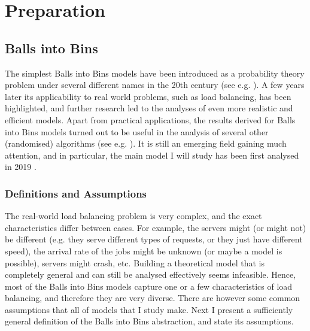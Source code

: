\chapter{Preparation}\label{preparation}

\ifpdf
    \graphicspath{{Chapter2/Figs/Raster/}{Chapter2/Figs/PDF/}{Chapter2/Figs/}}
\else
    \graphicspath{{Chapter2/Figs/Vector/}{Chapter2/Figs/}}
\fi



\section{Balls into Bins}


The simplest Balls into Bins models have been introduced as a probability theory problem under several different names in the 20th century (see e.g. \cite{kolchin1978coined}). A few years later its applicability to real world problems, such as load balancing, has been highlighted, and further research led to the analyses of even more realistic and efficient models. Apart from practical applications, the results derived for Balls into Bins models turned out to be useful in the analysis of several other (randomised) algorithms (see e.g. \cite{edmonds2006cakecutting}). It is still an emerging field gaining much attention, and in particular, the main model I will study has been first analysed in 2019 \cite{dwivedi2019firstthinning}.


\subsection{Definitions and Assumptions}



The real-world load balancing problem is very complex, and the exact characteristics differ between cases. For example, the servers might (or might not) be different (e.g. they serve different types of requests, or they just have different speed), the arrival rate of the jobs might be unknown (or maybe a model is possible), servers might crash, etc. Building a theoretical model that is completely general and can still be analysed effectively seems infeasible. Hence, most of the Balls into Bins models capture one or a few characteristics of load balancing, and therefore they are very diverse. There are however some common assumptions that all of models that I study make. Next I present a sufficiently general definition of the Balls into Bins abstraction, and state its assumptions. 


